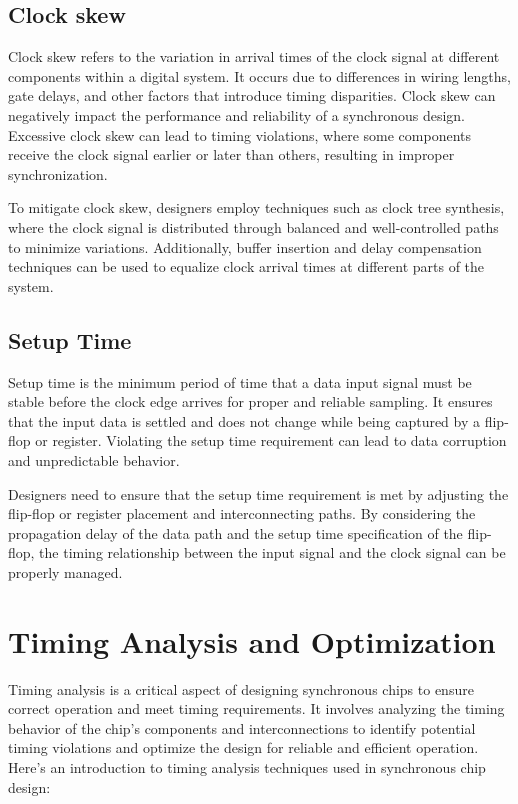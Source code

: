 \documentclass[a4paper,11pt]{report}
\begin{document}
\section{Clock skew}
Clock skew refers to the variation in arrival times of the clock signal at different components within a digital system. It occurs due to differences in wiring lengths, gate delays, and other factors that introduce timing disparities. Clock skew can negatively impact the performance and reliability of a synchronous design. Excessive clock skew can lead to timing violations, where some components receive the clock signal earlier or later than others, resulting in improper synchronization.

To mitigate clock skew, designers employ techniques such as clock tree synthesis, where the clock signal is distributed through balanced and well-controlled paths to minimize variations. Additionally, buffer insertion and delay compensation techniques can be used to equalize clock arrival times at different parts of the system.	

\section{Setup Time}
Setup time is the minimum period of time that a data input signal must be stable before the clock edge arrives for proper and reliable sampling. It ensures that the input data is settled and does not change while being captured by a flip-flop or register. Violating the setup time requirement can lead to data corruption and unpredictable behavior.

Designers need to ensure that the setup time requirement is met by adjusting the flip-flop or register placement and interconnecting paths. By considering the propagation delay of the data path and the setup time specification of the flip-flop, the timing relationship between the input signal and the clock signal can be properly managed.

\chapter{Timing Analysis and Optimization}

Timing analysis is a critical aspect of designing synchronous chips to ensure correct operation and meet timing requirements. It involves analyzing the timing behavior of the chip's components and interconnections to identify potential timing violations and optimize the design for reliable and efficient operation. Here's an introduction to timing analysis techniques used in synchronous chip design:
\end{document}
